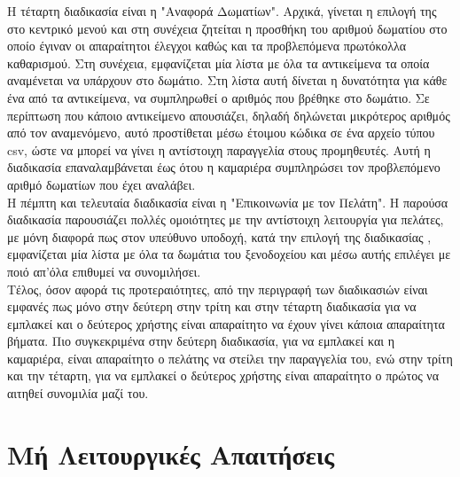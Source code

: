 \noindent
Η τέταρτη διαδικασία είναι η "Αναφορά Δωματίων".  Αρχικά, γίνεται η επιλογή της στο κεντρικό  μενού και 
στη συνέχεια ζητείται η προσθήκη του αριθμού δωματίου στο οποίο έγιναν οι απαραίτητοι έλεγχοι καθώς και 
τα προβλεπόμενα πρωτόκολλα καθαρισμού. Στη συνέχεια, εμφανίζεται μία λίστα με όλα τα αντικείμενα τα οποία
αναμένεται να υπάρχουν στο δωμάτιο. Στη λίστα αυτή δίνεται η δυνατότητα για κάθε ένα από τα αντικείμενα, να 
συμπληρωθεί  ο αριθμός που βρέθηκε στο δωμάτιο. Σε περίπτωση που κάποιο αντικείμενο απουσιάζει, δηλαδή 
δηλώνεται μικρότερος αριθμός από τον αναμενόμενο, αυτό προστίθεται μέσω έτοιμου κώδικα σε ένα αρχείο τύπου
csv, ώστε να μπορεί να γίνει η αντίστοιχη παραγγελία στους προμηθευτές. Αυτή η διαδικασία επαναλαμβάνεται 
έως ότου η καμαριέρα συμπληρώσει τον προβλεπόμενο αριθμό δωματίων που έχει αναλάβει.\\

\noindent 
Η πέμπτη και τελευταία διαδικασία είναι η "Επικοινωνία με τον Πελάτη". Η παρούσα διαδικασία παρουσιάζει πολλές 
ομοιότητες  με την αντίστοιχη λειτουργία  για πελάτες, με μόνη διαφορά πως στον υπεύθυνο υποδοχή, κατά την επιλογή 
της διαδικασίας , εμφανίζεται μία λίστα με όλα τα δωμάτια του ξενοδοχείου και μέσω αυτής επιλέγει με ποιό απ'όλα 
επιθυμεί να συνομιλήσει.\\

\noindent
Τέλος, όσον αφορά τις προτεραιότητες, από την περιγραφή των διαδικασιών είναι εμφανές πως  μόνο στην δεύτερη
στην τρίτη και στην τέταρτη διαδικασία για να εμπλακεί και ο δεύτερος χρήστης είναι απαραίτητο να έχουν γίνει 
κάποια απαραίτητα βήματα. Πιο συγκεκριμένα στην δεύτερη διαδικασία, για να εμπλακεί και η καμαριέρα, είναι 
απαραίτητο ο πελάτης να στείλει την παραγγελία του, ενώ στην τρίτη και την τέταρτη, για να εμπλακεί ο δεύτερος 
χρήστης είναι απαραίτητο ο πρώτος να αιτηθεί συνομιλία μαζί του.

\section{Μή Λειτουργικές Απαιτήσεις}
